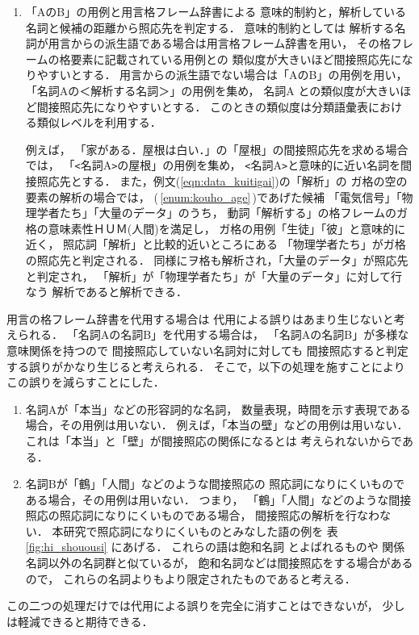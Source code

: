 \begin{enumerate}
\item 
「AのB」の用例と用言格フレーム辞書による
意味的制約と，解析している名詞と候補の距離から照応先を判定する．
意味的制約としては
解析する名詞が用言からの派生語である場合は用言格フレーム辞書を用い，
その格フレームの格要素に記載されている用例との
類似度が大きいほど間接照応先になりやすいとする．
用言からの派生語でない場合は「AのB」の用例を用い，
「名詞Aの＜解析する名詞＞」の用例を集め，
名詞A との類似度が大きいほど間接照応先になりやすいとする．
このときの類似度は分類語彙表における類似レベルを利用する．

例えば，
「家がある．屋根は白い．」の「屋根」の間接照応先を求める場合では，
「\verb+<+名詞A\verb+>+の屋根」の用例を集め，
\verb+<+名詞A\verb+>+と意味的に近い名詞を間接照応先とする．
また，例文(\ref{eqn:data_kuitigai})の「解析」の
ガ格の空の要素の解析の場合では，
($\,$\ref{enum:kouho_age}$\,$)であげた候補
「電気信号」「物理学者たち」「大量のデータ」のうち，
動詞「解析する」の格フレームのガ格の意味素性ＨＵＭ(人間)を満足し，
ガ格の用例「生徒」「彼」と意味的に近く，
照応詞「解析」と比較的近いところにある
「物理学者たち」がガ格の照応先と判定される．
同様にヲ格も解析され，「大量のデータ」が照応先と判定され，
「解析」が「物理学者たち」が「大量のデータ」に対して行なう
解析であると解析できる．

\end{enumerate}

用言の格フレーム辞書を代用する場合は
代用による誤りはあまり生じないと考えられる．
「名詞Aの名詞B」を代用する場合は，
「名詞Aの名詞B」が多様な意味関係を持つので
間接照応していない名詞対に対しても
間接照応すると判定する誤りがかなり生じると考えられる．
そこで，以下の処理を施すことによりこの誤りを減らすことにした．
\begin{enumerate}
\item 
名詞Aが「本当」などの形容詞的な名詞，
数量表現，時間を示す表現である場合，その用例は用いない．
例えば，「本当の壁」などの用例は用いない．
これは「本当」と「壁」が間接照応の関係になるとは
考えられないからである．
\item 
名詞Bが「鶴」「人間」などのような間接照応の
照応詞になりにくいものである場合，その用例は用いない．
つまり，
「鶴」「人間」などのような間接照応の照応詞になりにくいものである場合，
間接照応の解析を行なわない．
本研究で照応詞になりにくいものとみなした語の例を
表\ref{fig:hi_shouousi} にあげる．
これらの語は飽和名詞\cite{houwameishi}
とよばれるものや
関係名詞以外の名詞群と似ているが，
飽和名詞などは間接照応をする場合があるので，
これらの名詞よりもより限定されたものであると考える．
\end{enumerate}
この二つの処理だけでは代用による誤りを完全に消すことはできないが，
少しは軽減できると期待できる．

